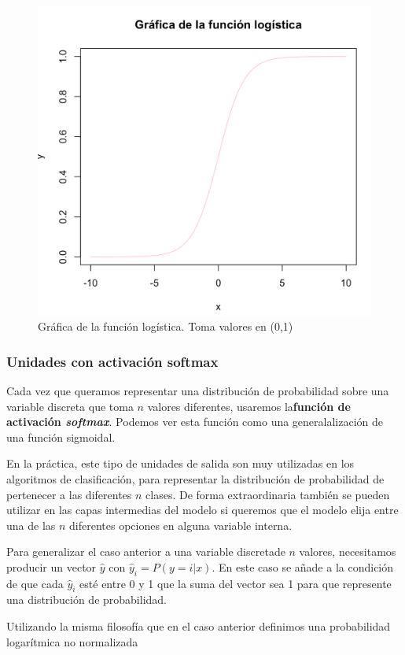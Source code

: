  		\begin{figure}[h!]
 			\centering
 			\includegraphics[width=0.7\linewidth]{imagenes/log}
 			\caption{Gráfica de la función logística. Toma valores en (0,1)}
 			\label{fig:log}
 		\end{figure}
 		 
		
	\subsubsection{Unidades con activación softmax} \label{softmax}
		
		Cada vez que queramos representar una distribución de probabilidad sobre una variable discreta que toma $n$ valores diferentes, usaremos la\textbf{función de activación \textit{softmax}}. Podemos ver esta función como una generalalización de una función sigmoidal.
		
		En la práctica, este tipo de unidades de salida son muy utilizadas en los algoritmos de clasificación, para representar la distribución de probabilidad de pertenecer a las diferentes $n$ clases. De forma extraordinaria también se pueden utilizar en las capas intermedias del modelo si queremos que el modelo elija entre una de las $n$ diferentes opciones en alguna variable interna.
		
		Para generalizar el caso anterior a una variable discretade $n$ valores, necesitamos producir un vector $\hat{y}$ con $\hat{y}_i=P(y=i|x)$. En este caso se añade a la condición de que cada $\hat{y}_i$ esté entre 0 y 1 que la suma del vector sea 1 para que represente una distribución de probabilidad. 
		
		Utilizando la misma filosofía que en el caso anterior definimos una probabilidad logarítmica no normalizada
		
